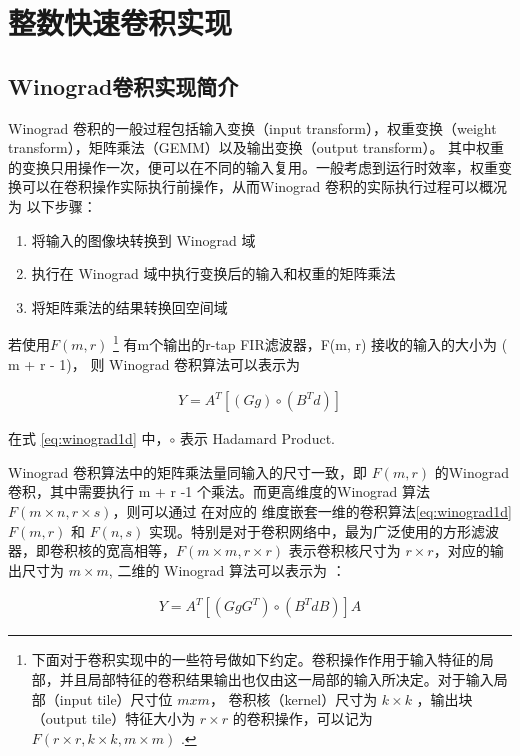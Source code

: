 
\chapter{整数快速卷积实现}
\label{cha:chapter03}

\section{Winograd卷积实现简介}

Winograd 卷积的一般过程包括输入变换（input transform），权重变换（weight transform），矩阵乘法（GEMM）以及输出变换（output transform）。
其中权重的变换只用操作一次，便可以在不同的输入复用。一般考虑到运行时效率，权重变换可以在卷积操作实际执行前操作，从而Winograd 卷积的实际执行过程可以概况为
以下步骤：
\begin{enumerate}
  \item 将输入的图像块转换到 Winograd 域
  \item 执行在 Winograd 域中执行变换后的输入和权重的矩阵乘法
  \item 将矩阵乘法的结果转换回空间域
\end{enumerate}

若使用$F(m, r)$ 
 \footnote{下面对于卷积实现中的一些符号做如下约定。卷积操作作用于输入特征的局部，并且局部特征的卷积结果输出也仅由这一局部的输入所决定。对于输入局部（input tile）尺寸位 $m x m $，
 卷积核（kernel）尺寸为 $k \times k$ ，输出块（output tile）特征大小为 $ r \times r $ 的卷积操作，可以记为 $ F(r\times r, k\times k, m\times m) $ .}
有m个输出的r-tap FIR滤波器，F(m, r) 接收的输入的大小为 ( m + r - 1)， 则 Winograd 卷积算法可以表示为

\begin{align}
\label{eq:winograd1d}
  Y = A^T [(Gg) \circ (B^Td)]
\end{align}

在式 \ref{eq:winograd1d} 中，$\circ$ 表示 Hadamard Product.

Winograd 卷积算法中的矩阵乘法量同输入的尺寸一致，即 $F(m, r)$ 的Winograd 卷积，其中需要执行 m + r -1 个乘法。而更高维度的Winograd 算法 $F(m \times n, r \times s)$，则可以通过
在对应的 维度嵌套一维的卷积算法\ref{eq:winograd1d} $F(m, r)$ 和 $F(n, s)$ 实现。特别是对于卷积网络中，最为广泛使用的方形滤波器，即卷积核的宽高相等，$F(m \times m, r \times r)$
表示卷积核尺寸为 $r \times r$，对应的输出尺寸为 $ m \times m$, 二维的 Winograd 算法可以表示为 ：

\begin{align}
\label{eq:winograd2d}
  Y = A^T [(GgG^T) \circ (B^TdB)] A
\end{align}


